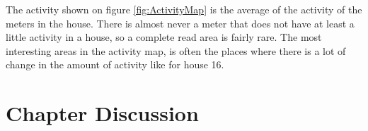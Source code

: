 The activity shown on figure \ref{fig:ActivityMap} is the average of the activity of the meters in the house. There is almost never a meter that does not have at least a little activity in a house, so a complete read area is fairly rare. The most interesting areas in the activity map, is often the places where there is a lot of change in the amount of activity like for house 16.

\section{Chapter Discussion}


% 

